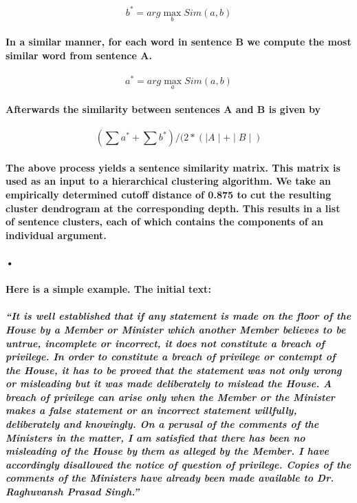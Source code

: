 \documentclass[lnbip]{svmultln}
\begin{document}
\[ b^* = arg \max_b Sim(a,b) \]

\paragraph*{In a similar manner, for each word in sentence B we compute the most similar word from sentence A.}

\[ a^* = arg \max_a Sim(a,b) \]

\paragraph*{Afterwards the similarity between sentences A and B is given by}
\[ ( \sum{a^*} + \sum{b^*}) / (2 * (\mid A\mid + \mid B \mid ) \]
\paragraph*{The above process yields a sentence similarity matrix. This matrix is used as an input to a hierarchical clustering algorithm. We take an empirically determined cutoff distance of 0.875 to cut the resulting cluster dendrogram at the corresponding depth. This results in a list of sentence clusters, each of which contains the components of an individual argument.}
\paragraph*{•}
\paragraph*{Here is a simple example. The initial text:}
\paragraph*{\emph{``It is well established that if any statement is made on the floor of the House by a Member or Minister which another Member believes to be untrue, incomplete or incorrect, it does not constitute a breach of privilege.  In order to constitute a breach of privilege or contempt of the House, it has to be proved that the statement was not only wrong or misleading but it was made deliberately to mislead the House.  A breach of privilege can arise only when the Member or the Minister makes a false statement or an incorrect statement willfully, deliberately and knowingly.    On a perusal of the comments of the Ministers in the matter, I am satisfied that there has been no misleading of the House by them as alleged by the Member.   I have accordingly disallowed the notice of question of privilege.  Copies of the comments of the Ministers have already been made available to Dr. Raghuvansh Prasad Singh.''}}
\end{document}
